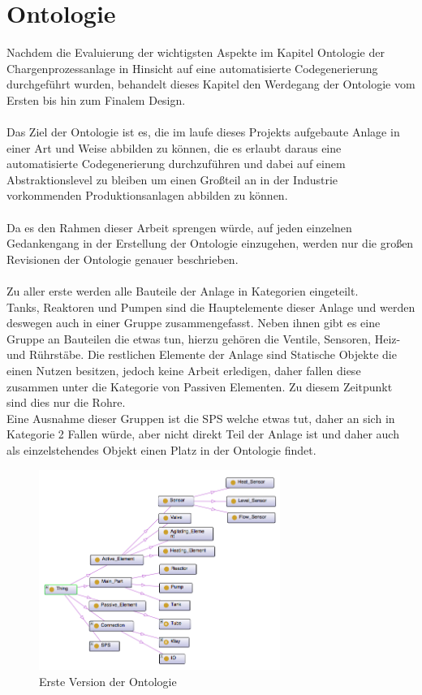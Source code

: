 \section{Ontologie}
Nachdem die Evaluierung der wichtigsten Aspekte im Kapitel Ontologie der Chargenprozessanlage in Hinsicht auf eine automatisierte Codegenerierung durchgeführt wurden, behandelt dieses Kapitel den Werdegang der Ontologie vom Ersten bis hin zum Finalem Design.\\
\\
Das Ziel der Ontologie ist es, die im laufe dieses Projekts aufgebaute Anlage in einer Art und Weise abbilden zu können, die es erlaubt daraus eine automatisierte Codegenerierung durchzuführen und dabei auf einem Abstraktionslevel zu bleiben um einen Großteil an in der Industrie vorkommenden Produktionsanlagen abbilden zu können.\\
\\
Da es den Rahmen dieser Arbeit sprengen würde, auf jeden einzelnen Gedankengang in der Erstellung der Ontologie einzugehen, werden nur die großen Revisionen der Ontologie genauer beschrieben.\\
\\
Zu aller erste werden alle Bauteile der Anlage in Kategorien eingeteilt.\\
Tanks, Reaktoren und Pumpen sind die Hauptelemente dieser Anlage und werden deswegen auch in einer Gruppe zusammengefasst. Neben ihnen gibt es eine Gruppe an Bauteilen die etwas tun, hierzu gehören die Ventile, Sensoren, Heiz- und Rührstäbe. Die restlichen Elemente der Anlage sind Statische Objekte die einen Nutzen besitzen, jedoch keine Arbeit erledigen, daher fallen diese zusammen unter die Kategorie von Passiven Elementen. Zu diesem Zeitpunkt sind dies nur die Rohre.\\
Eine Ausnahme dieser Gruppen ist die \ac{SPS} welche etwas tut, daher an sich in Kategorie 2 Fallen würde, aber nicht direkt Teil der Anlage ist und daher auch als einzelstehendes Objekt einen Platz in der Ontologie findet.

\begin{figure}[hbt!]
  \centering
  \includegraphics[width=0.7\textwidth]{graphics/implementation/Ontology_v1}
  \caption{Erste Version der Ontologie}
\end{figure}

